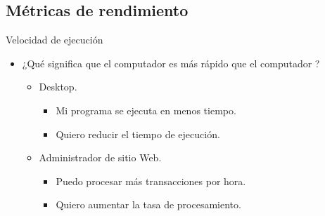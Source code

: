 \subsection{Métricas de rendimiento}

\begin{frame}[t]{Velocidad de ejecución}
\begin{itemize}
  \item ¿Qué significa que el computador  es más rápido
        que el computador ?
    \begin{itemize}
      \item Desktop.
        \begin{itemize}
          \item Mi programa se ejecuta en menos tiempo.
          \item Quiero reducir el tiempo de ejecución.
        \end{itemize}
      \item Administrador de sitio Web.
        \begin{itemize}
          \item Puedo procesar más transacciones por hora.
          \item Quiero aumentar la tasa de procesamiento.
        \end{itemize}
    \end{itemize}
\end{itemize}
\end{frame}

